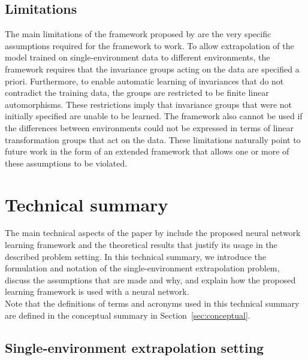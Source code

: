  
\subsection{Limitations}

The main limitations of the framework proposed by \textcite{Mouli:2021} are the very specific assumptions required for the framework to work. To allow extrapolation of the model trained on single-environment data to different environments, the framework requires that the invariance groups acting on the data are specified a priori. Furthermore, to enable automatic learning of invariances that do not contradict the training data, the groups are restricted to be finite linear automorphisms. These restrictions imply that invariance groups that were not initially specified are unable to be learned. The framework also cannot be used if the differences between environments could not be expressed in terms of linear transformation groups that act on the data. These limitations naturally point to future work in the form of an extended framework that allows one or more of these assumptions to be violated.



\newpage



\section{Technical summary}

The main technical aspects of the paper by \textcite{Mouli:2021} include the proposed neural network learning framework and the theoretical results that justify its usage in the described problem setting. In this technical summary, we introduce the formulation and notation of the single-environment extrapolation problem, discuss the assumptions that are made and why, and explain how the proposed learning framework is used with a neural network.
\\

Note that the definitions of terms and acronyms used in this technical summary are defined in the conceptual summary in Section~\ref{sec:conceptual}.


\subsection{Single-environment extrapolation setting}

